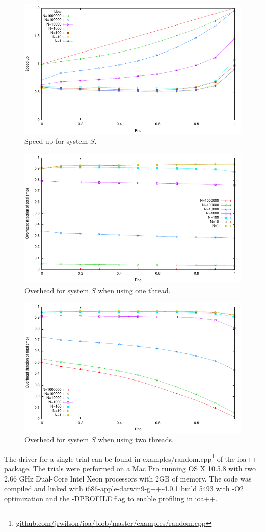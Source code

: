 \begin{figure}
\center
\includegraphics[width=.72\columnwidth]{speed_up}
\caption{Speed-up for system $S$.\label{speed_up}}
\end{figure}

\begin{figure}
\center
\includegraphics[width=.72\columnwidth]{overhead1}
\caption{Overhead for system $S$ when using one thread.\label{overhead1}}
\end{figure}

\begin{figure}
\center
\includegraphics[width=.72\columnwidth]{overhead2}
\caption{Overhead for system $S$ when using two threads.\label{overhead2}}
\end{figure}

The driver for a single trial can be found in examples/random.cpp\footnote{\url{github.com/jrwilson/ioa/blob/master/examples/random.cpp}} of the ioa++ package.
The trials were performed on a Mac Pro running OS X 10.5.8 with two 2.66 GHz Dual-Core Intel Xeon processors with 2GB of memory.
The code was compiled and linked with i686-apple-darwin9-g++-4.0.1 build 5493 with -O2 optimization and the -DPROFILE flag to enable profiling in ioa++.

